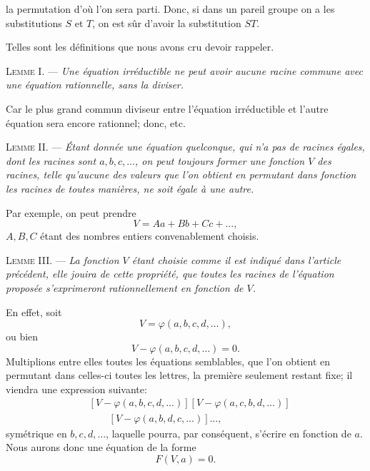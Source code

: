 
la permutation d'où l'on sera parti. Donc, si dans un pareil
groupe on a les substitutions $S$ et $T$, on est sûr d'avoir la substitution $ST$.

Telles sont les définitions que nous avons cru devoir rappeler.

\medskip
\noindent\textsc{Lemme I.} --- \emph{Une équation irréductible ne peut avoir aucune
racine commune avec une équation rationnelle, sans la diviser.}

Car le plus grand commun diviseur entre l'équation irréductible
et l'autre équation sera encore rationnel; donc, etc.

\medskip
\noindent\textsc{Lemme II.} --- \emph{Étant donnée une équation quelconque, qui
n'a pas de racines égales, dont les racines sont $a,b,c,\ldots$, on
peut toujours former une fonction $V$ des racines, telle qu'aucune
des valeurs que l'on obtient en permutant dans  fonction
les racines de toutes manières, ne soit égale à une autre.}

Par exemple, on peut prendre
\[
V=Aa+Bb+Cc+\ldots,
\]
$A,B,C$ étant des nombres entiers convenablement choisis.

\medskip
\noindent\textsc{Lemme III.} --- \emph{La fonction $V$ étant choisie comme il est indiqué
dans l'article précédent, elle jouira de cette propriété,
que toutes les racines de l'équation proposée s'exprimeront rationnellement
en fonction de $V$.}

En effet, soit
\[
V=\varphi(a,b,c,d,\ldots),
\]
ou bien
\[
V-\varphi(a,b,c,d,\ldots)=0.
\]
Multiplions entre elles toutes les équations semblables, que l'on
obtient en permutant dans celles-ci toutes les lettres, la première
seulement restant fixe; il viendra une expression suivante:
\[
\begin{split}
&[V-\varphi(a,b,c,d,\ldots)]
[V-\varphi(a,c,b,d,\ldots)]\\
&\qquad [V-\varphi(a,b,d,c,\ldots)]\ldots,
\end{split}
\]
symétrique en $b,c,d,\ldots$, laquelle pourra, par conséquent,
s'écrire en fonction de $a$. Nous aurons donc une équation de la
forme
\[
F(V,a)=0.
\]
